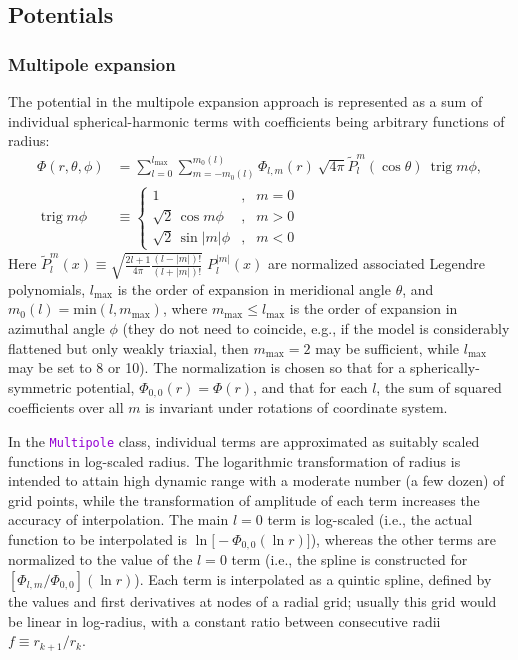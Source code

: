 \documentclass[12pt]{article}
\newcommand{\ttt}[1]{\textcolor{darkviolet}{\texttt{#1}}}
\DeclareMathOperator{\trig}{trig}
\begin{document}
\subsection{Potentials}  \label{sec:PotentialDetails}


\subsubsection{Multipole expansion}  \label{sec:PotentialMultipoleDetails}

The potential in the multipole expansion approach is represented as a sum of individual spherical-harmonic terms with coefficients being arbitrary functions of radius:
\begin{align}
\Phi(r,\theta,\phi) &= \sum_{l=0}^{l_\mathrm{max}}\sum_{m=-m_0(l)}^{m_0(l)}
\Phi_{l,m}(r)\: \sqrt{4\pi} \tilde P_l^m(\cos\theta)\:\trig m\phi, \\
\trig m\phi &\equiv \left\{\begin{array}{rcl} 
  1 &,& m=0 \\
  \sqrt{2}\,\cos  m \phi &,& m > 0 \\
  \sqrt{2}\,\sin |m|\phi &,& m < 0 
\end{array}\right.   \nonumber
\end{align}
Here $\tilde P_l^m(x) \equiv \sqrt{\frac{2l+1}{4\pi}\frac{(l-|m|)!}{(l+|m|)!}} \;P_l^{|m|}(x)$ 
are normalized associated Legendre polynomials, $l_\mathrm{max}$ is the order of expansion in meridional angle $\theta$, and $m_0(l) = \mathrm{min}(l, m_\mathrm{max})$, where $m_\mathrm{max} \le l_\mathrm{max}$ is the order of expansion in azimuthal angle $\phi$ (they do not need to coincide, e.g., if the model is considerably flattened but only weakly triaxial, then $m_\mathrm{max}=2$ may be sufficient, while $l_\mathrm{max}$ may be set to 8 or 10). The normalization is chosen so that for a spherically-symmetric potential, $\Phi_{0,0}(r)=\Phi(r)$, and that for each $l$, the sum of squared coefficients over all $m$ is invariant under rotations of coordinate system.

In the \ttt{Multipole} class, individual terms are approximated as suitably scaled functions in log-scaled radius. The logarithmic transformation of radius is intended to attain high dynamic range with a moderate number (a few dozen) of grid points, while the transformation of amplitude of each term increases the accuracy of interpolation. The main $l=0$ term is log-scaled (i.e., the actual function to be interpolated is $\ln\big[-\Phi_{0,0}(\ln r)\big]$), whereas the other terms are normalized to the value of the $l=0$ term (i.e., the spline is constructed for $[\Phi_{l,m}/\Phi_{0,0}](\ln r)$). Each term is interpolated as a quintic spline, defined by the values and first derivatives at nodes of a radial grid; usually this grid would be linear in log-radius, with a constant ratio between consecutive radii $f\equiv r_{k+1}/r_k$.
\end{document}
